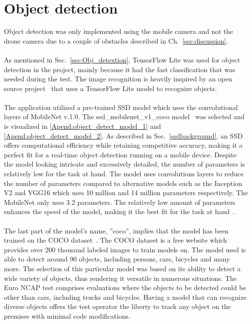\section{Object detection} \label{sec:image_rec}
Object detection was only implemented using the mobile camera and not the drone camera due to a couple of obstacles described in Ch.~\ref{sec:discussion}.
\\ \\
As mentioned in Sec.~\ref{sec:Obj_detextion}, TensorFlow Lite was used for object detection in the project, mainly because it had the fast classification that was needed during the test. The image recognition is heavily inspired by an open source project~\cite{githubTensorFlowApp} that uses a TensorFlow Lite model to recognize objects. 
\\ \\
The application utilized a pre-trained SSD model which uses the convolutional layers of MobileNet v.1.0. The ssd\_mobilenet\_v1\_coco model~\cite{TensorFlow2021TensorFlowZoo} was selected and is visualized in \ref{Apend:object_detect_model_1} and \ref{Apend:object_detect_model_2}. As described in Sec.~\ref{ssdbackground}, an SSD offers computational efficiency while retaining competitive accuracy, making it a perfect fit for a real-time object detection running on a mobile device. Despite the model looking intricate and excessively detailed, the number of parameters is relatively low for the task at hand. The model uses convolutions layers to reduce the number of parameters compared to alternative models such as the Inception V2 and VGG16\cite{mobilenet} which uses 10 million and 14 million parameters respectively. The MobileNet only uses 3.2 parameters. The relatively low amount of parameters enhances the speed of the model, making it the best fit for the task at hand~\cite{cnnforklarning}.
\\ \\
The last part of the model's name, ''coco'', implies that the model has been trained on the COCO dataset~\cite{COCOConsortiumCommonContext}. The COCO dataset is a free website which provides over 200 thousand labeled images to train models on. The model used is able to detect around 90 objects, including persons, cars, bicycles and many more. The selection of this particular model was based on its ability to detect a wide variety of objects, thus rendering it versatile in numerous situations. The Euro NCAP test comprises evaluations where the objects to be detected could be other than cars, including trucks and bicycles. Having a model that can recognize diverse objects offers the test operator the liberty to track any object on the premises with minimal code modifications.
